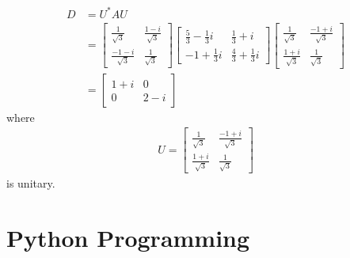 \begin{solution}
\begin{align*}
D &= U^*AU \\
&= 
\begin{bmatrix}
\frac{1}{\sqrt{3}} & \frac{1-i}{\sqrt{3}} \\ 
\frac{-1-i}{\sqrt{3}}  & \frac{1}{\sqrt{3}}
\end{bmatrix}
\begin{bmatrix}
\frac{5}{3}-\frac{1}{3}i &\frac{1}{3}+i \\ 
-1+\frac{1}{3}i & \frac{4}{3}+\frac{1}{3}i
\end{bmatrix}
\begin{bmatrix}
\frac{1}{\sqrt{3}} & \frac{-1+i}{\sqrt{3}} \\ 
\frac{1+i}{\sqrt{3}} & \frac{1}{\sqrt{3}}
\end{bmatrix} \\
&= 
\begin{bmatrix}
1+i & 0 \\
0 & 2-i
\end{bmatrix}
\end{align*}
where
\begin{align*}
U = \begin{bmatrix}
\frac{1}{\sqrt{3}} & \frac{-1+i}{\sqrt{3}} \\ 
\frac{1+i}{\sqrt{3}} & \frac{1}{\sqrt{3}}
\end{bmatrix} 
\end{align*}
is unitary.
\end{solution}

\section{Python Programming}

